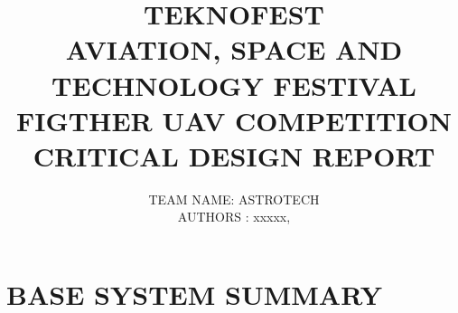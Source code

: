 \documentclass[12pt]{article}
\begin{document}


\begin{titlepage}
    \centering

	\title{ %
		TEKNOFEST \\
		AVIATION, SPACE AND TECHNOLOGY FESTIVAL \\
		FIGTHER UAV COMPETITION \\
		CRITICAL DESIGN REPORT \\}
	\author{
		TEAM NAME: ASTROTECH \\
		AUTHORS : xxxxx,\\} %
	\date{}
	\maketitle
\end{titlepage}	


{}
\tableofcontents %
\clearpage


\section{BASE SYSTEM SUMMARY}
\end{document}
